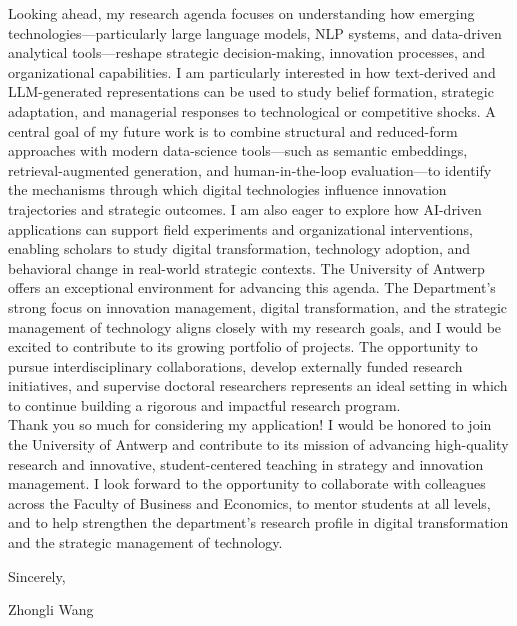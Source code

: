 \documentclass{nfr}
\begin{document}
Looking ahead, my research agenda focuses on understanding how emerging technologies—particularly large language models, NLP systems, and data-driven analytical tools—reshape strategic decision-making, innovation processes, and organizational capabilities. 
I am particularly interested in how text-derived and LLM-generated representations can be used to study belief formation, strategic adaptation, and managerial responses to technological or competitive shocks. 
A central goal of my future work is to combine structural and reduced-form approaches with modern data-science tools—such as semantic embeddings, retrieval-augmented generation, and human-in-the-loop evaluation—to identify the mechanisms through which digital technologies influence innovation trajectories and strategic outcomes. 
I am also eager to explore how AI-driven applications can support field experiments and organizational interventions, enabling scholars to study digital transformation, technology adoption, and behavioral change in real-world strategic contexts. 
The University of Antwerp offers an exceptional environment for advancing this agenda. 
The Department’s strong focus on innovation management, digital transformation, and the strategic management of technology aligns closely with my research goals, and I would be excited to contribute to its growing portfolio of projects. 
The opportunity to pursue interdisciplinary collaborations, develop externally funded research initiatives, and supervise doctoral researchers represents an ideal setting in which to continue building a rigorous and impactful research program.\\

Thank you so much for considering my application! 
I would be honored to join the University of Antwerp and contribute to its mission of advancing high-quality research and innovative, student-centered teaching in strategy and innovation management. 
I look forward to the opportunity to collaborate with colleagues across the Faculty of Business and Economics, to mentor students at all levels, and to help strengthen the department’s research profile in digital transformation and the strategic management of technology. 
\vspace{3mm}

\noindent Sincerely,\\
\vspace{10mm}

\noindent Zhongli Wang

\end{document}
